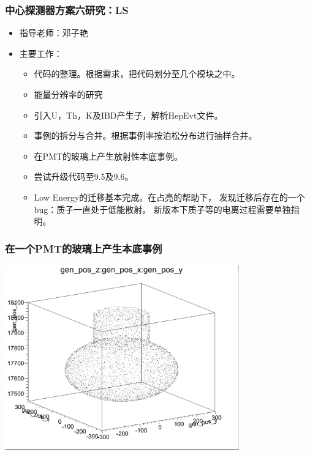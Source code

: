 \begin{frame}
    \frametitle{中心探测器方案六研究：LS}
    \begin{itemize}
        \item 指导老师：邓子艳
        \item 主要工作：
            \begin{itemize}
                \item 代码的整理。根据需求，把代码划分至几个模块之中。
                \item 能量分辨率的研究
                \item 引入U，Th，K及IBD产生子，解析HepEvt文件。
                \item 事例的拆分与合并。根据事例率按泊松分布进行抽样合并。
                \item 在PMT的玻璃上产生放射性本底事例。
                \item 尝试升级代码至9.5及9.6。
                \item Low Energy的迁移基本完成。在占亮的帮助下，
                      发现迁移后存在的一个bug：质子一直处于低能散射。
                      新版本下质子等的电离过程需要单独指明。
            \end{itemize}
    \end{itemize}
\end{frame}

\begin{frame}
    \frametitle{在一个PMT的玻璃上产生本底事例}
    \includegraphics[height=8cm,keepaspectratio]{data/gen_in_pmt.png}
\end{frame}


